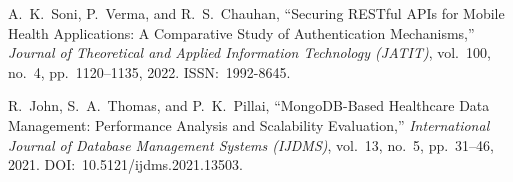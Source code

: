 \documentclass[12pt,a4paper]{article}
\begin{document}
\begin{enumerate}[label={[\arabic*]}]
\item A.~K.~Soni, P.~Verma, and R.~S.~Chauhan, ``Securing RESTful APIs for Mobile Health Applications: A Comparative Study of Authentication Mechanisms,'' \textit{Journal of Theoretical and Applied Information Technology (JATIT)}, vol.~100, no.~4, pp.~1120--1135, 2022. ISSN:~1992-8645.

\item R.~John, S.~A.~Thomas, and P.~K.~Pillai, ``MongoDB-Based Healthcare Data Management: Performance Analysis and Scalability Evaluation,'' \textit{International Journal of Database Management Systems (IJDMS)}, vol.~13, no.~5, pp.~31--46, 2021. DOI:~10.5121/ijdms.2021.13503.
\end{enumerate}
\end{document}
